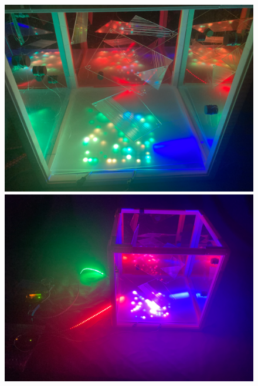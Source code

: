\documentclass{article}
\begin{document}
\begin{figure}[h]
    \centering
  \begin{minipage}[b]{0.4\textwidth}
    \includegraphics[width=\textwidth]{images/unnamed16.png}
  \end{minipage}
  \hfill
  \begin{minipage}[b]{0.4\textwidth}
    \includegraphics[width=\textwidth]{images/unnamed17.png}
  \end{minipage}
\end{figure}

\newpage
\end{document}
